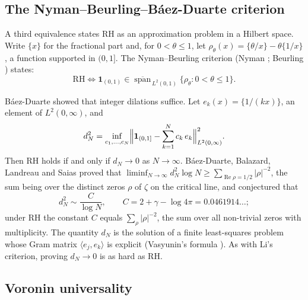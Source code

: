 \documentclass[11pt]{amsart}
\theoremstyle{definition}
\theoremstyle{remark}
\begin{document}
\subsection{The Nyman--Beurling--B\'aez-Duarte criterion}\label{sec:nb}

A third equivalence states RH as an approximation problem in a Hilbert space. Write $\{x\}$ for the fractional part and, for $0<\theta\le1$, let $\rho_\theta(x)=\{\theta/x\}-\theta\{1/x\}$, a function supported in $(0,1]$. The Nyman--Beurling criterion (Nyman \cite{nyman1950}; Beurling \cite{beurling1955}) states:
\begin{equation}
\text{RH} \iff \mathbf{1}_{(0,1)} \in \overline{\operatorname{span}}_{\,L^2(0,1)} \{\rho_\theta : 0 < \theta \le 1\}.
\end{equation}

B\'aez-Duarte \cite{baezduarte2003} showed that integer dilations suffice. Let $e_k(x)=\{1/(kx)\}$, an element of $L^2(0,\infty)$, and
\begin{equation}
d_N^2 = \inf_{c_1,\dots,c_N} \Bigl\| \mathbf{1}_{(0,1]} - \sum_{k=1}^N c_k\, e_k \Bigr\|_{L^2(0,\infty)}^2 .
\end{equation}
Then RH holds if and only if $d_N \to 0$ as $N \to \infty$. B\'aez-Duarte, Balazard, Landreau and Saias \cite{bdbls2000} proved that $\liminf_{N\to\infty} d_N^2\log N\ge\sum_{\operatorname{Re}\rho=1/2}|\rho|^{-2}$, the sum being over the distinct zeros $\rho$ of $\zeta$ on the critical line, and conjectured that
\begin{equation}
d_N^2 \sim \frac{C}{\log N}, \qquad C = 2+\gamma-\log 4\pi=0.0461914\ldots;
\end{equation}
under RH the constant $C$ equals $\sum_{\rho}|\rho|^{-2}$, the sum over all non-trivial zeros with multiplicity. The quantity $d_N$ is the solution of a finite least-squares problem whose Gram matrix $\langle e_j,e_k\rangle$ is explicit (Vasyunin's formula \cite{vasyunin1995}). As with Li's criterion, proving $d_N\to0$ is as hard as RH.

\subsection{Voronin universality}\label{sec:universality}
\end{document}
